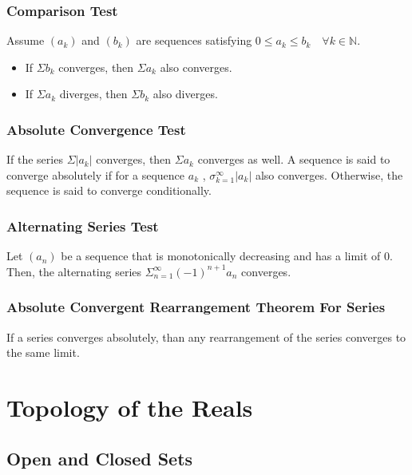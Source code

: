 \documentclass{article}
\begin{document}
\subsubsection{Comparison Test}
Assume \( (a_{k}) \) and \( (b_{k})  \) are sequences satisfying \( 0 \leq a_{k} \leq b_{k} \quad \forall k \in \mathbb{N} \).


\begin{itemize}

\item If \( \Sigma b_{k}  \) converges, then \(  \Sigma a_{k}  \) also converges.

\item If \( \Sigma a_{k} \) diverges, then \( \Sigma b_{k} \) also diverges.


\end{itemize}

\subsubsection{Absolute Convergence Test}

If the series \( \Sigma \left |  a_{k}  \right |  \) converges, then \( \Sigma a_{k}  \) converges as well. A sequence is said to converge absolutely if for a sequence \( a_{k} \) , \(  \sigma_{k=1}^{\infty} | a_{k} |  \) also converges. Otherwise, the sequence is said to converge conditionally.

\subsubsection{Alternating Series Test}
Let \( (a_{n}) \) be a sequence that is monotonically decreasing and has a limit of 0. Then, the alternating series \( \Sigma_{n=1}^{\infty} (-1)^{n+1} a_{n}   \) converges.

\subsubsection{Absolute Convergent Rearrangement Theorem For Series}

If a series converges absolutely, than any rearrangement of the series converges to the same limit.

\section{Topology of the Reals}


\subsection{Open and Closed Sets}
\end{document}
